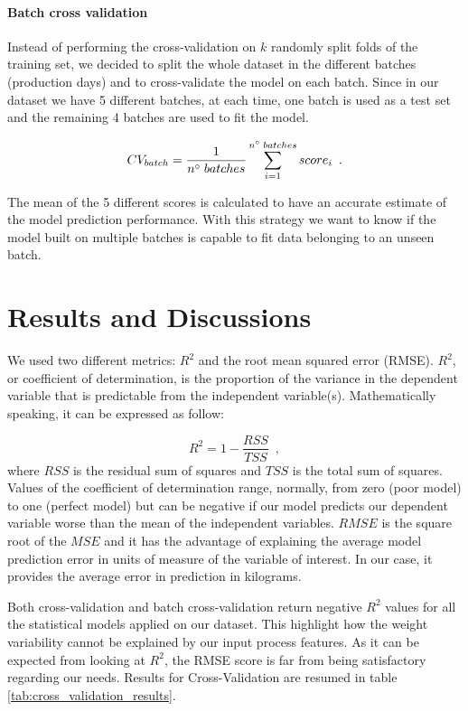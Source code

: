 \paragraph{Batch cross validation}

Instead of performing the cross-validation on $k$ randomly split folds of the training set, we decided to split the whole dataset in the different batches (production days) and to cross-validate the model on each batch. Since in our dataset we have 5 different batches, at each time, one batch is used as a test set and the remaining 4 batches are used to fit the model.

\begin{equation}
    CV_{batch} = \frac{1}{n\degree\;batches}\sum_{i=1}^{n\degree\;batches}score_{i}
    \enspace.
\end{equation}

The mean of the 5 different scores is calculated to have an accurate estimate of the model prediction performance. With this strategy we want to know if the model built on multiple batches is capable to fit data belonging to an unseen batch.  


\section{Results and Discussions} \label{Results and Discussions}

We used two different metrics: $R^2$ and the root mean squared error (RMSE). $R^2$, or coefficient of determination, is the proportion of the variance in the dependent variable that is predictable from the independent variable(s). Mathematically speaking, it can be expressed as follow:

\begin{equation}
    R^2 = 1 - \frac{RSS}{TSS}
    \enspace,
\end{equation}
where $RSS$ is the residual sum of squares and $TSS$ is the total sum of squares.
Values of the coefficient of determination range, normally, from zero (poor model) to one (perfect model) but can be negative if our model predicts our dependent variable worse than the mean of the independent variables. $RMSE$ is the square root of the $MSE$ and it has the advantage of explaining the average model prediction error in units of measure of the variable of interest. In our case, it provides the average error in prediction in kilograms. 

Both cross-validation and batch cross-validation return negative $R^2$ values for all the statistical models applied on our dataset. This highlight how the weight variability cannot be explained by our input process features. As it can be expected from looking at $R^2$, the RMSE score is far from being satisfactory regarding our needs. Results for Cross-Validation are resumed in table \ref{tab:cross_validation_results}.  

